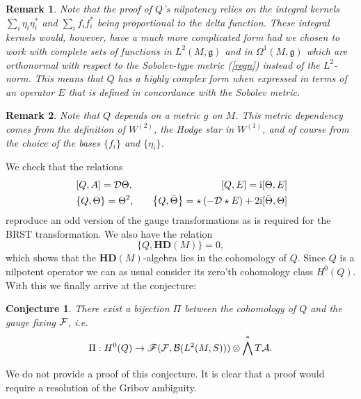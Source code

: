 \documentclass[letterpaper,11pt]{article}
\newcommand{\nn}{\nonumber}
\def\OO{\Omega}
\def\P{\Pi}
\def\ca{{\cal A}}
\def\cb{{\cal B}}
\def\cd{{\cal D}}
\def\cf{{\cal F}}
\newtheorem{conj}[thm]{Conjecture}
\newtheorem{remark}{Remark}
\begin{document}
\begin{remark}
Note that the proof of $Q$'s nilpotency relies on the integral kernels $\sum_i {\eta}_i {\eta}_i^* $ and $\sum_i f_i f_i^*$ being proportional to the delta function. These integral kernels would, however, have a much more complicated form had we chosen to work with complete sets of functions in $L^2(M,\mathfrak{g})$ and in $\OO^1(M,\mathfrak{g})$ which are orthonormal with respect to the Sobolev-type metric (\ref{regn}) instead of the $L^2$-norm. This means that $Q$ has a highly complex form when expressed in terms of an operator 
${E}$ that is defined in concordance with the Sobolev metric. 
\end{remark}
\begin{remark}
Note that $Q$ depends on a metric $g$ on $M$. This metric dependency comes from the definition of $W^{(2)}$, the Hodge star in $W^{(1)}$, and of course from the choice of the bases $\{f_i\}$ and $\{ \eta_i \}$. 
\end{remark}
We check that the relations
\begin{eqnarray}
&\left[Q  , A  \right]  =  \cd\Theta ,&\quad
\left[Q  , {E}  \right]  = \mathrm{i}[\Theta, {E}]
\nn\\
&\left\{Q  , \Theta  \right\}  = \Theta^2  ,&\quad
\left\{Q  , \bar{\Theta}  \right\}  =\star\left( - \cd\star {E}\right) %
+ 2\mathrm{i}[\bar{\Theta},\Theta]
\nn
\end{eqnarray}
reproduce an odd version of the gauge transformations as is required for the BRST transformation.
We also have the relation 
$$
 \{Q, \mathbf{HD}(M) \}=0,  
$$
which shows that the $\mathbf{HD}(M)$-algebra  lies in the cohomology of $Q$.
Since $Q$ is a nilpotent operator we can as usual consider its zero'th cohomology class $H^0(Q)$. With this we finally arrive at the conjecture:
\begin{conj}
There exist a bijection $\P$ between the  cohomology of $Q$ and the gauge fixing $\cf$, i.e.
$$
\P: H^0(Q)\rightarrow \mathscr{F}(\cf, \cb (L^2(M,S ))) \otimes\bigwedge^* T\ca  .
$$
\end{conj}
We do not provide a proof of this conjecture. It is clear that a proof would require a resolution of the Gribov ambiguity.
\end{document}
